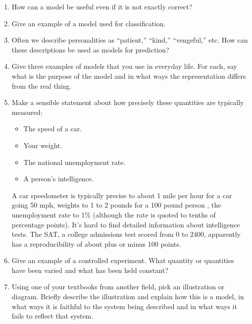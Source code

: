 


\begin{enumerate}


\item How can a model be useful even if it is not exactly correct?\\
\TextEntry[itemname=useful]

\item Give an example of a model used for classification.\\
\TextEntry[itemname=classif]

\item Often we describe personalities as ``patient,'' ``kind,'' 
  ``vengeful,'' etc.  How can these descriptions be used as models for
  prediction? \\
\TextEntry[itemname=personal]

\item Give three examples of models that you use in everyday life.
  For each, say what is
  the purpose of the model and in what ways the representation
  differs from the real thing. \\
\TextEntry[itemname=everyday]



\item Make a sensible statement about how precisely these quantities are
  typically measured:
\begin{itemize}
\item The speed of a car.
\item Your weight.
\item The national unemployment rate.
\item A person's intelligence.
\end{itemize}
\TextEntry[itemname=precision]


\begin{AnswerText}
A car speedometer is typically precise to about 1 mile per hour for a
car going 50 mph,
weights to 1 to 2 pounds for a 100 pound person , the unemployment rate to 1\% (although the
rate is quoted to tenths of percentage points).  It's hard to find
detailed information about intelligence tests.   The SAT, a college
admissions test scored from 0 to 2400, apparently has a
reproducibility of about plus or minus 100 points.

\end{AnswerText}


\item Give an example of a controlled experiment.  What quantity or quantities
  have been varied and what has been held
  constant?\\
\TextEntry[itemname=experiment]



\item Using one of your textbooks from another field, pick an
  illustration or diagram. Briefly describe the illustration and 
  explain how this is a model, in what ways
  it is faithful to the system being described and in what ways it
  fails to reflect that system. \TextEntry[itemname=textbook]
\end{enumerate}
